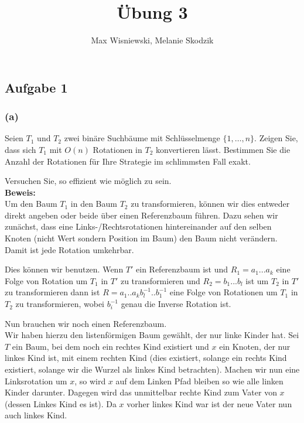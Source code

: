 \documentclass[11pt,a4paper,ngerman]{article}
\date{}
\title{Übung 3}
\author{Max Wisniewski, Melanie Skodzik}
\begin{document}

\renewcommand{\figurename}{Grafik}

\maketitle
\thispagestyle{fancy}


\subsection*{Aufgabe 1}

\subsubsection*{(a)}
Seien $T_1$ und $T_2$ zwei binäre Suchbäume mit Schlüsselmenge $\{1, \ldots, n\}$. Zeigen Sie, dass sich $T_1$ mit $O(n)$ Rotationen in $T_2$ konvertieren lässt. Bestimmen Sie die Anzahl der Rotationen für Ihre Strategie im schlimmsten Fall exakt.

Versuchen Sie, so effizient wie möglich zu sein.\\

\noindent\textbf{Beweis:}\\

Um den Baum $T_1$ in den Baum $T_2$ zu transformieren, können wir dies entweder direkt angeben oder beide über einen Referenzbaum führen. Dazu sehen wir zunächst, dass eine Links-/Rechtsrotationen hintereinander auf den selben Knoten (nicht Wert sondern Position im Baum) den Baum nicht verändern. Damit ist jede Rotation umkehrbar.

Dies können wir benutzen. Wenn $T'$ ein Referenzbaum ist und $R_1 = a_1 ... a_k$ eine Folge von Rotation um $T_1$ in $T'$ zu transformieren und
$R_2 = b_1 ... b_l$ ist um $T_2$ in $T'$ zu transformieren dann ist $R = a_1 .. a_k b_l^{-1} .. b_1^{-1}$ eine Folge von Rotationen um $T_1$ in $T_2$ zu transformieren,
wobei $b_i^{-1}$ genau die Inverse Rotation ist.

Nun brauchen wir noch einen Referenzbaum.\\

Wir haben hierzu den listenförmigen Baum gewählt, der nur linke Kinder hat. Sei $T$ ein Baum, bei dem noch ein rechtes Kind existiert und $x$ ein Knoten, der nur linkes Kind ist, mit einem rechten Kind (dies existiert, solange ein rechts Kind existiert, solange wir die Wurzel als linkes Kind betrachten). Machen wir nun eine Linksrotation um $x$,
so wird $x$ auf dem Linken Pfad bleiben so wie alle linken Kinder darunter. Dagegen wird das unmittelbar rechte Kind zum Vater von $x$ (dessen Linkes Kind es ist). Da $x$ vorher linkes Kind war ist der neue Vater nun auch linkes Kind.\\
\end{document}
